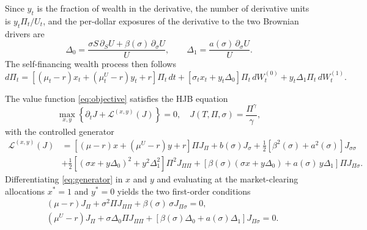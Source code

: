 \documentclass[11pt]{article}
\theoremstyle{remark}
\begin{document}
Since $y_{t}$ is the fraction of wealth in the derivative, the number of derivative units is $y_{t}\Pi_{t}/U_{t}$, and the per-dollar exposures of the derivative to the two Brownian drivers are
\begin{equation}\label{eq:deltas}
\Delta_{0} = \frac{\sigma S\,\partial_{S}U + \beta(\sigma)\,\partial_{\sigma}U}{U}, \qquad
\Delta_{1} = \frac{a(\sigma)\,\partial_{\sigma}U}{U}.
\end{equation}
The self-financing wealth process then follows
\begin{equation}\label{eq:wealth}
d\Pi_{t} = \left[(\mu_{t}-r)x_{t} + (\mu^{U}_{t} - r) y_{t} + r\right] \Pi_{t}\, dt
+ \left[ \sigma_{t}x_{t}  + y_{t} \Delta_{0} \right] \Pi_{t}\, dW^{(0)}_{t} + y_{t} \Delta_{1} \Pi_{t}\, dW^{(1)}_{t}.
\end{equation}

The value function \eqref{eq:objective} satisfies the HJB equation
\begin{equation}\label{eq:hjb}
\max_{x, y} \left\{ \partial_{t} J + \mathcal{L}^{(x,y)}(J)\right\} = 0, \quad J(T,\Pi,\sigma)=\frac{\Pi^{\gamma}}{\gamma},
\end{equation}
with the controlled generator
\begin{equation}\label{eq:generator}
\begin{split}
\mathcal{L}^{(x,y)}(J) & =  \left[(\mu-r)x + (\mu^{U} - r)y + r\right]\Pi J_{\Pi} + b(\sigma)J_{\sigma} +\frac{1}{2}\left[\beta^{2}(\sigma) + a^{2}(\sigma)\right]J_{\sigma\sigma}\\
& + \frac{1}{2}\left[ \left(\sigma x + y\Delta_{0}\right)^{2} + y^{2}\Delta_{1}^{2}\right]\Pi^{2} J_{\Pi\Pi}
+ \left[ \beta(\sigma) \left(\sigma x + y\Delta_{0}\right)  + a(\sigma)\, y \Delta_{1} \right] \Pi J_{\Pi\sigma}.
\end{split}
\end{equation}
Differentiating \eqref{eq:generator} in $x$ and $y$ and evaluating at the market-clearing allocations $x^{*}=1$ and $y^{*}=0$ yields the two first-order conditions
\begin{equation}\label{eq:focs}
\begin{split}
& (\mu-r) J_{\Pi} + \sigma^{2}\Pi J_{\Pi\Pi}+ \beta(\sigma)\, \sigma  J_{\Pi\sigma} = 0,\\
& (\mu^{U} - r) J_{\Pi} + \sigma \Delta_{0} \Pi J_{\Pi\Pi}+  \left[ \beta(\sigma) \Delta_{0} + a(\sigma)\Delta_{1} \right] J_{\Pi\sigma} = 0.
\end{split}
\end{equation}
\end{document}
